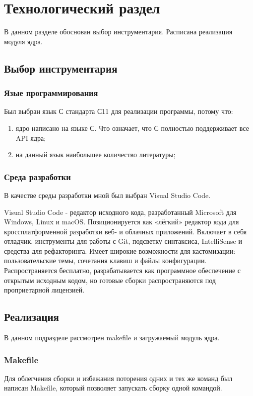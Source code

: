 \section{Технологический раздел}
В данном разделе обоснован выбор инструментария. Расписана реализация модуля ядра.
\subsection{Выбор инструментария}
\subsubsection{Язые программирования}
Был выбран язык С стандарта С11 для реализации программы, потому что:
\begin{enumerate}
	\item ядро написано на языке С.
	Что означает, что С полностью поддерживает все API ядра;
	\item на данный язык наибольшее количество литературы;
\end{enumerate}

\subsubsection{Среда разработки}
В качестве среды разработки мной был выбран Visual Studio Code.

Visual Studio Code - редактор исходного кода, разработанный Microsoft для Windows, Linux и macOS. Позиционируется как «лёгкий» редактор кода для кроссплатформенной разработки веб- и облачных приложений. Включает в себя отладчик, инструменты для работы с Git, подсветку синтаксиса, IntelliSense и средства для рефакторинга. Имеет широкие возможности для кастомизации: пользовательские темы, сочетания клавиш и файлы конфигурации. Распространяется бесплатно, разрабатывается как программное обеспечение с открытым исходным кодом, но готовые сборки распространяются под проприетарной лицензией.

\subsection{Реализация}
В данном подразделе рассмотрен makefile и загружаемый модуль ядра.
\subsubsection{Makefile}
Для облегчения сборки и избежания поторения одних и тех же команд был написан Makefile, который позволяет запускать сборку одной командой.


